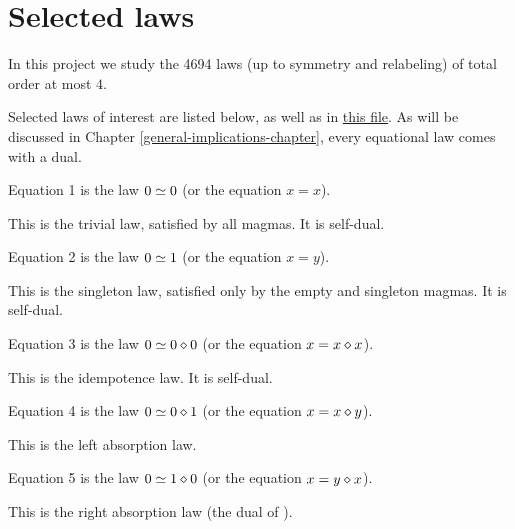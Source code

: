 \chapter{Selected laws}\label{subgraph-eq}

In this project we study the 4694 laws (up to symmetry and relabeling) of total order at most $4$.

Selected laws of interest are listed below, as well as in \href{https://github.com/teorth/equational_theories/blob/main/equational_theories/Equations/Basic.lean}{this file}.  As will be discussed in Chapter \ref{general-implications-chapter}, every equational law comes with a dual.

\begin{definition}[Equation 1]\label{eq1}\leanok{}  Equation 1 is the law $0 \simeq 0$ (or the equation $x=x$).
\end{definition}

This is the trivial law, satisfied by all magmas. It is self-dual.


\begin{definition}[Equation 2]\label{eq2}\leanok{}  Equation 2 is the law $0 \simeq 1$ (or the equation $x=y$).
\end{definition}

This is the singleton law, satisfied only by the empty and singleton magmas.  It is self-dual.

\begin{definition}[Equation 3]\label{eq3}\leanok{}  Equation 3 is the law $0 \simeq 0 \diamond 0$ (or the equation $x = x \diamond x$).
\end{definition}

This is the idempotence law.  It is self-dual.

\begin{definition}[Equation 4]\label{eq4}\leanok{}  Equation 4 is the law $0 \simeq 0 \diamond 1$ (or the equation $x = x \diamond y$).
\end{definition}

This is the left absorption law.

\begin{definition}[Equation 5]\label{eq5}\leanok{}  Equation 5 is the law $0 \simeq 1 \diamond 0$ (or the equation $x = y \diamond x$).
\end{definition}

This is the right absorption law (the dual of ).

